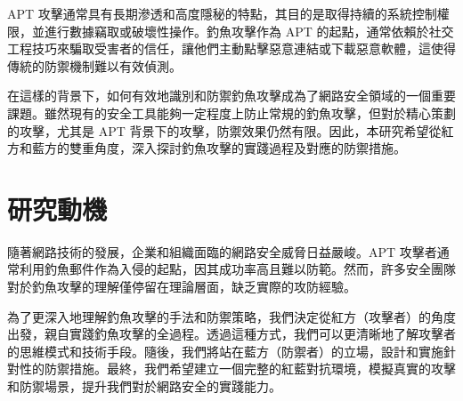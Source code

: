 \documentclass[a4paper,12pt]{article}
\begin{document}
APT 攻擊通常具有長期滲透和高度隱秘的特點，其目的是取得持續的系統控制權限，並進行數據竊取或破壞性操作。釣魚攻擊作為 APT 的起點，通常依賴於社交工程技巧來騙取受害者的信任，讓他們主動點擊惡意連結或下載惡意軟體，這使得傳統的防禦機制難以有效偵測。

在這樣的背景下，如何有效地識別和防禦釣魚攻擊成為了網路安全領域的一個重要課題。雖然現有的安全工具能夠一定程度上防止常規的釣魚攻擊，但對於精心策劃的攻擊，尤其是 APT 背景下的攻擊，防禦效果仍然有限。因此，本研究希望從紅方和藍方的雙重角度，深入探討釣魚攻擊的實踐過程及對應的防禦措施。

\section{研究動機}
隨著網路技術的發展，企業和組織面臨的網路安全威脅日益嚴峻。APT 攻擊者通常利用釣魚郵件作為入侵的起點，因其成功率高且難以防範。然而，許多安全團隊對於釣魚攻擊的理解僅停留在理論層面，缺乏實際的攻防經驗。

為了更深入地理解釣魚攻擊的手法和防禦策略，我們決定從紅方（攻擊者）的角度出發，親自實踐釣魚攻擊的全過程。透過這種方式，我們可以更清晰地了解攻擊者的思維模式和技術手段。隨後，我們將站在藍方（防禦者）的立場，設計和實施針對性的防禦措施。最終，我們希望建立一個完整的紅藍對抗環境，模擬真實的攻擊和防禦場景，提升我們對於網路安全的實踐能力。

\end{document}

